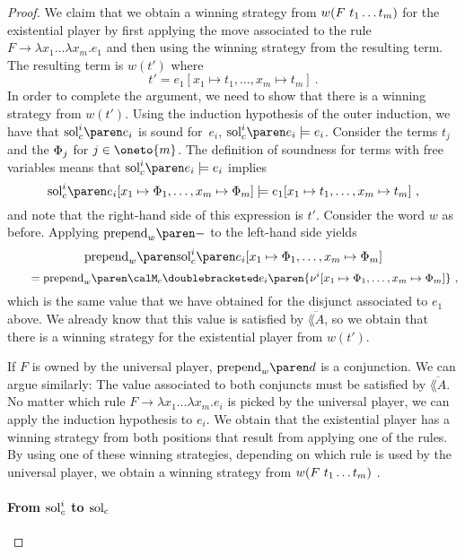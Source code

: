 \documentclass[../../diss.tex]{subfiles}
\begin{document}
\begin{proof}
        We claim that we obtain a winning strategy from $w ( F \  t_1 \ldots t_m)$ for the existential player by first applying the move associated to the rule $F \to \lambda x_1 \ldots \lambda x_m . e_1$ and then using the winning strategy from the resulting term.
        The resulting term is $w (t')$ where
        \[
            t' = e_1 [ x_1 \mapsto t_1, \ldots, x_m \mapsto t_m ]
            \ .
        \]
        In order to complete the argument, we need to show that there is a winning strategy from $w(t')$.
        Using the induction hypothesis of the outer induction, we have that $\solc{i}{e_i}$ is sound for~$e_i$, $\solc{i}{e_i} \gamesound e_i$.
        Consider the terms $t_j$ and the $\Phi_j$ for $j \in \oneto{m}$.
        The definition of soundness for terms with free variables means that $\solc{i}{e_i} \gamesound e_i$ implies
        \[
            \solc{i}{e_i}[x_1 \mapsto \judgment_1, \ldots, x_m \mapsto \judgment_m] \gamesound e_1[x_1 \mapsto t_1, \ldots, x_m \mapsto t_m]
            \ ,
        \]
        and note that the right-hand side of this expression is $t'$.
        Consider the word $w$ as before.
        Applying $\prepend{w}{-}$ to the left-hand side yields
        \[
            \prepend{w}{\solc{i}{e_i}[x_1 \mapsto \judgment_1, \ldots, x_m \mapsto \judgment_m]}
        \]
        \[
            \qquad =
            \prepend{w}{\semc{e_i}{\paren{\val^i[x_1 \mapsto \judgment_1, \ldots, x_m \mapsto \judgment_m]}}}
            \ ,
        \]
        which is the same value that we have obtained for the disjunct associated to $e_1$ above.
        We already know that this value is satisfied by $\overline{\lang{A}}$, so we obtain that there is a winning strategy for the existential player from $w(t')$.



        If $F$ is owned by the universal player, $\prepend{w}{d}$ is a conjunction.
        We can argue similarly:
        The value associated to both conjuncts must be satisfied by $\overline{\lang{A}}$.
        No matter which rule $F \to \lambda x_1 \ldots \lambda x_m. e_i$ is picked by the universal player, we can apply the induction hypothesis to $e_i$.
        We obtain that the existential player has a winning strategy from both positions that result from applying one of the rules.
        By using one of these winning strategies, depending on which rule is used by the universal player, we obtain a winning strategy from $w (F \  t_1 \ldots t_m)$ .

    \paragraph{From $\text{sol}_{c}^{i}$ to $\solc$}


\end{proof}
\end{document}
